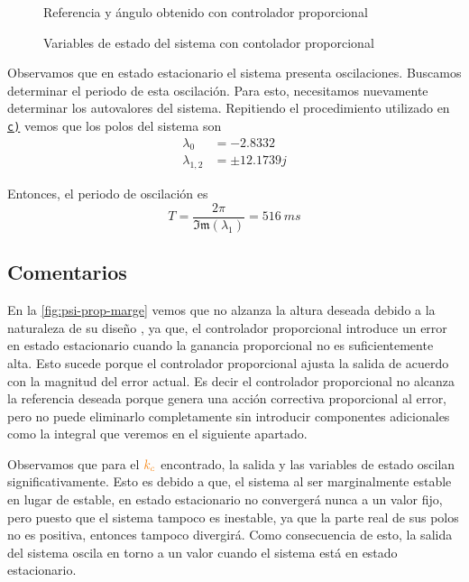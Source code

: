 \begin{figure}[h]
  \centering
  
  \caption{Referencia y ángulo obtenido con controlador proporcional}\label{fig:psi-prop-marge}
\end{figure}

\begin{figure}[h]
  \centering
  
  \caption{Variables de estado del sistema con contolador proporcional}\label{fig:estado-prop-marge}
\end{figure}

\FloatBarrier

Observamos que en estado estacionario el sistema presenta oscilaciones. Buscamos
determinar el periodo de esta oscilación. Para esto, necesitamos nuevamente determinar
los autovalores del sistema. Repitiendo el procedimiento utilizado en \hyperref[pregunta-c]{\texttt{c)}}
vemos que los polos del sistema son
\begin{align*}
    \lambda_{0} &= -2.8332 \\
    \lambda_{1,2} &= \pm 12.1739j
\end{align*}

Entonces, el periodo de oscilación es
\begin{equation}
    T = \frac{2\pi}{\mathfrak{Im}(\lambda_{1})} = 516\ \unit{ms}
\end{equation}

\subsection{Comentarios}

En la \autoref{fig:psi-prop-marge} vemos que no alzanza la altura deseada 
debido a la naturaleza de su diseño , ya  que, el controlador proporcional 
introduce un error en estado estacionario cuando la ganancia proporcional no es 
suficientemente alta. Esto sucede porque el controlador proporcional ajusta la 
salida de acuerdo con la magnitud del error actual.
Es decir el controlador proporcional no alcanza la referencia deseada porque 
genera una acción correctiva proporcional al error, pero no puede eliminarlo 
completamente sin introducir componentes adicionales como la integral que 
veremos en el siguiente apartado.

Observamos que para el $\nara{k_{c}}$ encontrado, la salida y las variables de
estado oscilan significativamente. Esto es debido a que, el sistema al ser
marginalmente estable en lugar de estable, en estado estacionario no convergerá
nunca a un valor fijo, pero puesto que el sistema tampoco es inestable, ya que
la parte real de sus polos no es positiva, entonces tampoco divergirá. Como
consecuencia de esto, la salida del sistema oscila en torno a un valor cuando
el sistema está en estado estacionario.






